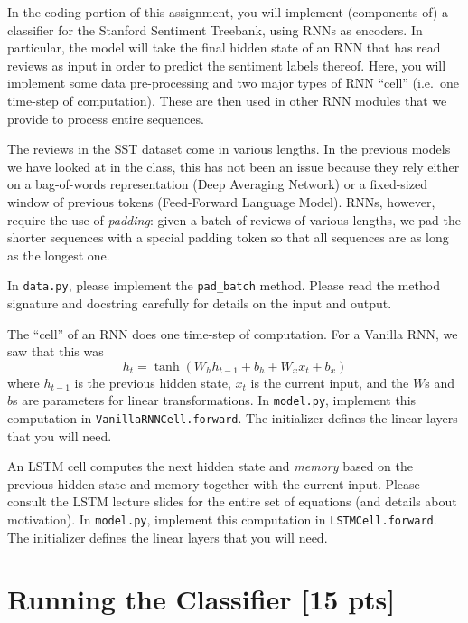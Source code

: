 \documentclass[11pt]{article}
\begin{document}
In the coding portion of this assignment, you will implement (components of) a classifier for the Stanford Sentiment Treebank, using RNNs as encoders.  In particular, the model will take the final hidden state of an RNN that has read reviews as input in order to predict the sentiment labels thereof.  Here, you will implement some data pre-processing and two major types of RNN ``cell'' (i.e.\ one time-step of computation).  These are then used in other RNN modules that we provide to process entire sequences.

\vspace{2em}
 The reviews in the SST dataset come in various lengths.  In the previous models we have looked at in the class, this has not been an issue because they rely either on a bag-of-words representation (Deep Averaging Network) or a fixed-sized window of previous tokens (Feed-Forward Language Model).  RNNs, however, require the use of \emph{padding}: given a batch of reviews of various lengths, we pad the shorter sequences with a special padding token so that all sequences are as long as the longest one.

In \texttt{data.py}, please implement the \texttt{pad\_batch} method.  Please read the method signature and docstring carefully for details on the input and output. 

\vspace{2em}
 The ``cell'' of an RNN does one time-step of computation.  For a Vanilla RNN, we saw that this was
\[ h_t = \tanh\left( W_h h_{t-1} + b_h + W_x x_t + b_x \right) \]
where $h_{t-1}$ is the previous hidden state, $x_t$ is the current input, and the $W$s and $b$s are parameters for linear transformations. In \texttt{model.py}, implement this computation in \texttt{VanillaRNNCell.forward}.  The initializer defines the linear layers that you will need.

\vspace{2em}
 An LSTM cell computes the next hidden state and \emph{memory} based on the previous hidden state and memory together with the current input.  Please consult the LSTM lecture slides for the entire set of equations (and details about motivation). In \texttt{model.py}, implement this computation in \texttt{LSTMCell.forward}. The initializer defines the linear layers that you will need.


\section{Running the Classifier [15 pts]}
\end{document}
